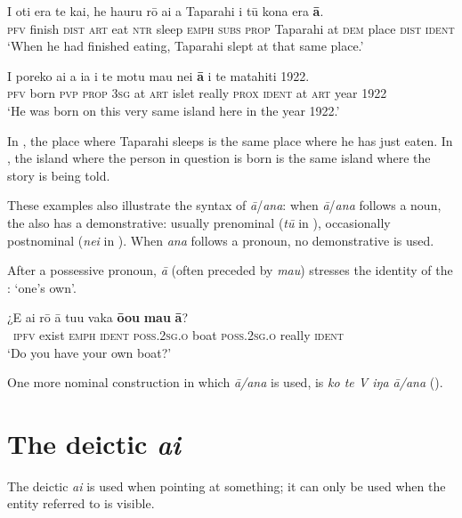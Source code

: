 \ea\label{ex:5.157}
\gll I oti era te kai, he ha{\ꞌ}uru rō {\ꞌ}ai a Taparahi {\ꞌ}i tū kona era \textbf{{\ꞌ}ā}. \\
\textsc{pfv} finish \textsc{dist} \textsc{art} eat \textsc{ntr} sleep \textsc{emph} \textsc{subs} \textsc{prop} Taparahi at \textsc{dem} place \textsc{dist} \textsc{ident} \\

\glt 
‘When he had finished eating, Taparahi slept at that same place.’ \textstyleExampleref{[R250.032]} 
\z

\ea\label{ex:5.158}
\gll I poreko ai a ia {\ꞌ}i te motu mau nei \textbf{{\ꞌ}ā} {\ꞌ}i te matahiti 1922. \\
\textsc{pfv} born \textsc{pvp} \textsc{prop} \textsc{3sg} at \textsc{art} islet really \textsc{prox} \textsc{ident} at \textsc{art} year 1922 \\

\glt
‘He was born on this very same island here in the year 1922.’ \textstyleExampleref{[R487.041]} 
\z

In , the place where Taparahi sleeps is the same place where he has just eaten. In , the island where the person in question is born is the same island where the story is being told. 

These examples also illustrate the syntax of \textit{{\ꞌ}ā}/\textit{{\ꞌ}ana}: when \textit{{\ꞌ}ā}/\textit{{\ꞌ}ana} follows a noun, the  also has a demonstrative: usually prenominal (\textit{tū} in ), occasionally postnominal (\textit{nei} in ). When \textit{{\ꞌ}ana} follows a pronoun, no demonstrative is used. 

After a possessive pronoun, \textit{{\ꞌ}ā} (often preceded by \textit{mau}) stresses the identity of the : ‘one’s own’.

\ea\label{ex:5.159}
\gll ¿E ai rō {\ꞌ}ā tu{\ꞌ}u vaka \textbf{ō{\ꞌ}ou} \textbf{mau} \textbf{{\ꞌ}ā}? \\
~\textsc{ipfv} exist \textsc{emph} \textsc{ident} \textsc{poss.2sg.o} boat \textsc{poss.2sg.o} really \textsc{ident} \\

\glt 
‘Do you have your own boat?’ \textstyleExampleref{[Notes]}
\z

One more nominal construction in which \textit{{\ꞌ}ā/{\ꞌ}ana} is used, is \textit{ko te V iŋa {\ꞌ}ā/{\ꞌ}ana} (). 

\section{The deictic  \textit{ai}}\label{sec:5.10}
The deictic  \textit{ai} is used when pointing at something; it can only be used when the entity referred to is visible.

